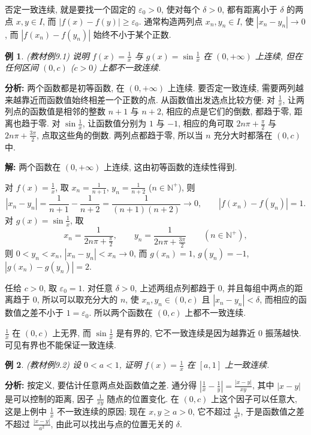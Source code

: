\documentclass[UTF8,openany]{ctexbook}
\theoremstyle{chinesetextbook}
\newtheorem{example}{例}[section]
\newenvironment{cnsolution}{\par\indent\textbf{解:} \ignorespaces}{\par}
\begin{document}
否定一致连续, 就是要找一个固定的 $\varepsilon_0>0$, 使对每个 $\delta>0$, 都有距离小于 $\delta$ 的两点 $x,y\in I$, 而 $|f(x)-f(y)|\ge\varepsilon_0$. 通常构造两列点 $x_n,y_n\in I$, 使 $|x_n-y_n|\to0$, 而 $|f(x_n)-f(y_n)|$ 始终不小于某个正数.
\begin{example}
\textnormal{(教材例9.1)} 说明 $\displaystyle f(x)=\frac1x$ 与 $\displaystyle g(x)=\sin\frac1x$ 在 $(0,+\infty)$ 上连续, 但在任何区间 $(0,c)$ ($c>0$) 上都不一致连续.
\end{example}
\par\indent\textbf{分析:} 两个函数都是初等函数, 在 $(0,+\infty)$ 上连续. 要否定一致连续, 需要两列越来越靠近而函数值始终相差一个正数的点. 从函数值出发选点比较方便: 对 $\displaystyle\frac1x$, 让两列点的函数值是相邻的整数 $n+1$ 与 $n+2$, 相应的点是它们的倒数, 都趋于零, 距离也趋于零. 对 $\displaystyle\sin\frac1x$, 让函数值分别为 $1$ 与 $-1$, 相应的角可取 $\displaystyle2n\pi+\frac\pi2$ 与 $\displaystyle2n\pi+\frac{3\pi}2$, 点取这些角的倒数. 两列点都趋于零, 所以当 $n$ 充分大时都落在 $(0,c)$ 中.
\begin{cnsolution}
两个函数在 $(0,+\infty)$ 上连续, 这由初等函数的连续性得到.

对 $\displaystyle f(x)=\frac1x$, 取 $\displaystyle x_n=\frac1{n+1}$, $\displaystyle y_n=\frac1{n+2}$ ($n\in\mathbb N^+$), 则
\[
|x_n-y_n|=\frac1{n+1}-\frac1{n+2}=\frac1{(n+1)(n+2)}\to0,\qquad|f(x_n)-f(y_n)|=1.
\]
对 $\displaystyle g(x)=\sin\frac1x$, 取
\[
x_n=\frac1{2n\pi+\frac\pi2},\qquad y_n=\frac1{2n\pi+\frac{3\pi}2}\qquad(n\in\mathbb N^+),
\]
则 $0<y_n<x_n$, $|x_n-y_n|<x_n\to0$, 而 $g(x_n)=1$, $g(y_n)=-1$, $|g(x_n)-g(y_n)|=2$.

任给 $c>0$, 取 $\varepsilon_0=1$. 对任意 $\delta>0$, 上述两组点列都趋于 $0$, 并且每组中两点的距离趋于 $0$, 所以可以取充分大的 $n$, 使 $x_n,y_n\in(0,c)$ 且 $|x_n-y_n|<\delta$, 而相应的函数值之差不小于 $1=\varepsilon_0$. 所以两个函数在 $(0,c)$ 上都不一致连续.
\end{cnsolution}
$\displaystyle\frac1x$ 在 $(0,c)$ 上无界, 而 $\displaystyle\sin\frac1x$ 是有界的, 它不一致连续是因为越靠近 $0$ 振荡越快. 可见有界也不能保证一致连续.
\begin{example}
\textnormal{(教材例9.2)} 设 $0<a<1$, 证明 $\displaystyle f(x)=\frac1x$ 在 $[a,1]$ 上一致连续.
\end{example}
\par\indent\textbf{分析:} 按定义, 要估计任意两点处函数值之差. 通分得 $\displaystyle\left|\frac1x-\frac1y\right|=\frac{|x-y|}{xy}$, 其中 $|x-y|$ 是可以控制的距离, 因子 $\displaystyle\frac1{xy}$ 随点的位置变化. 在 $(0,c)$ 上这个因子可以任意大, 这是上例中 $\displaystyle\frac1x$ 不一致连续的原因; 现在 $x,y\ge a>0$, 它不超过 $\displaystyle\frac1{a^2}$, 于是函数值之差不超过 $\displaystyle\frac{|x-y|}{a^2}$, 由此可以找出与点的位置无关的 $\delta$.
\end{document}
